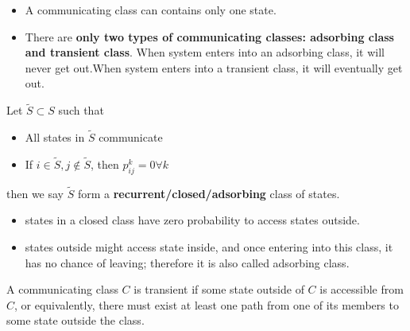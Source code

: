 \begin{refsection}
\begin{remark}\hfill
\begin{itemize}
\item A communicating class can contains only one state.    
\item There are \textbf{only two types of communicating classes: adsorbing class and transient class}. When system enters into an adsorbing class, it will never get out.When system enters into a transient class, it will eventually get out.  
\end{itemize}
\end{remark}



\begin{definition} Let $\tilde{S}\subset S$ such that 
\begin{itemize}
    \item All states in $\tilde{S}$ communicate
    \item If $i\in \tilde{S},j \notin \tilde{S}$, then $p^k_{ij} = 0 \forall k$
\end{itemize} 
then we say $\tilde{S}$ form a \textbf{recurrent/closed/adsorbing} class of states.
\end{definition} 

\begin{remark}[interpretation]\hfill
\begin{itemize}
    \item states in a closed class have zero probability to access states outside.
    \item states outside might access state inside, and once entering into this class, it has no chance of leaving; therefore it is also called adsorbing class. 
\end{itemize}
\end{remark}

\begin{definition}
\cite[237]{luenberger1979introduction} A communicating class $C$ is transient if some state outside of $C$ is accessible from $C$, or equivalently, there must exist at least one path from one of its members to some state outside the class.
\end{definition}

\iffalse
\begin{definition}[transient states, alternative] A states belongs to some recurrent class is a recurrent state; otherwise it is transient states. We have
$$\lim_{k\rightarrow \infty} p^k_{ii} = 0 ~ \text{if and only if i is transient}$$
State $j$ is absorbing if and only if $P(j,j)=1$.
\end{definition}
\fi


\end{refsection}
